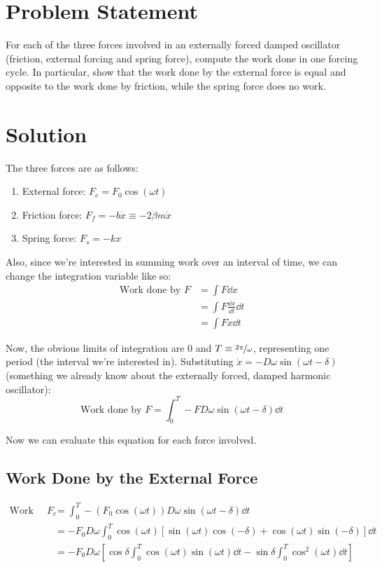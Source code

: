 \documentclass{article}
\begin{document}
\insertTitle

\section{Problem Statement}
For each of the three forces involved in an externally forced damped oscillator (friction, external forcing and spring force), compute the work done in one forcing cycle. In particular, show that the work done by the external force is equal and opposite to the work done by friction, while the spring force does no work.

\section{Solution}
The three forces are as follows:
\begin{enumerate}
\item External force: $F_e = F_0\cos(\omega t)$
\item Friction force: $F_f = -b\dot{x} \equiv -2\beta m\dot{x}$
\item Spring force: $F_s = -kx$
\end{enumerate}

Also, since we're interested in summing work over an interval of time, we can change the integration variable like so:
\begin{equation*}
\begin{aligned}
\text{Work done by } F &= \int F\dd x \\
&= \int F\frac{\dd x}{\dd t}\dd t \\
&= \int F\dot{x}\dd t
\end{aligned}
\end{equation*}

Now, the obvious limits of integration are 0 and $T \equiv \nicefrac{2\pi}{\omega}$, representing one period (the interval we're interested in). Substituting $\dot{x} = -D\omega\sin(\omega t -\delta)$ (something we already know about the externally forced, damped harmonic oscillator):
\begin{equation}
\text{Work done by } F = \int_0^T -FD\omega\sin(\omega t-\delta)\dd t
\end{equation}

Now we can evaluate this equation for each force involved.

\subsection{Work Done by the External Force}
\begin{equation*}
\begin{aligned}
\text{Work done by } F_e &= \int_0^T -(F_0\cos(\omega t))D\omega\sin(\omega t-\delta)\dd t \\
&= -F_0D\omega\int_0^T \cos(\omega t)[\sin(\omega t)\cos(-\delta) + \cos(\omega t)\sin(-\delta)]\dd t \\
&= -F_0D\omega\left[\cos\delta\int_0^T\cos(\omega t)\sin(\omega t)\dd t - \sin\delta\int_0^T\cos^2(\omega t) \dd t \right]
\end{aligned}
\end{equation*}
\end{document}
